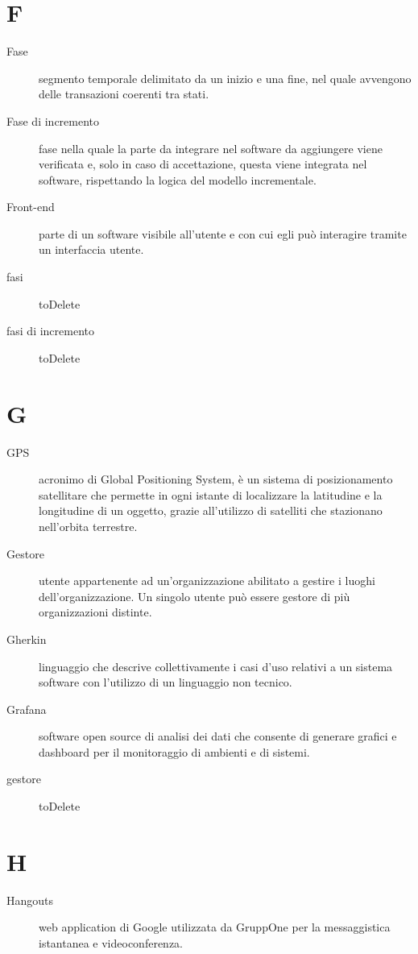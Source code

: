 \documentclass{article}
\begin{document}
	\section{F}
	\begin{description}
		\item[Fase] segmento temporale delimitato da un inizio e una fine, nel quale avvengono delle transazioni coerenti tra stati.
		\item[Fase di incremento] fase nella quale la parte da integrare nel software da aggiungere viene verificata e, solo in caso di accettazione, questa viene integrata nel software, rispettando la logica del modello incrementale.
		\item[Front-end] parte di un software visibile all'utente e con cui egli può interagire tramite un interfaccia utente.
		\item[fasi] toDelete
		\item[fasi di incremento] toDelete
	\end{description}
	\section{G}
	\begin{description}
		\item[GPS] acronimo di Global Positioning System, è un sistema di posizionamento satellitare che permette in ogni istante di localizzare la latitudine e la longitudine di un oggetto, grazie all'utilizzo di satelliti che stazionano nell'orbita terrestre.
		\item[Gestore] utente appartenente ad un'organizzazione abilitato a gestire i luoghi dell'organizzazione. Un singolo utente può essere gestore di più organizzazioni distinte.
		\item[Gherkin] linguaggio che descrive collettivamente i casi d'uso relativi a un sistema software con l'utilizzo di un linguaggio non tecnico.
		\item[Grafana] software open source di analisi dei dati che consente di generare grafici e dashboard per il monitoraggio di ambienti e di sistemi.
		\item[gestore] toDelete
	\end{description}
	\section{H}
	\begin{description}
		\item[Hangouts] web application di Google utilizzata da GruppOne per la messaggistica istantanea e videoconferenza.
	\end{description}
\end{document}
